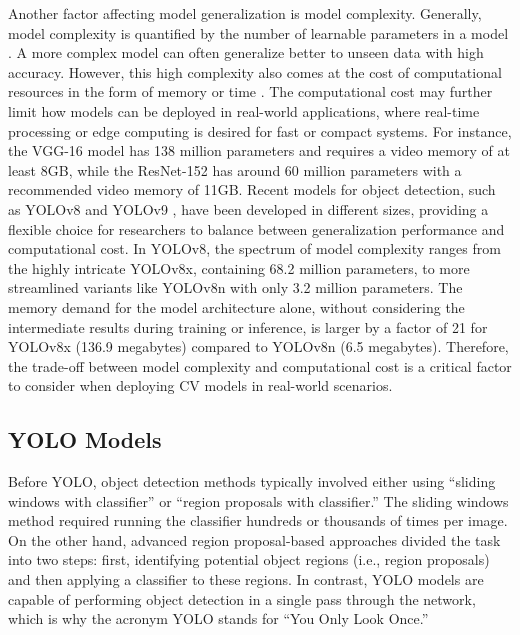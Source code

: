Another factor affecting model generalization is model complexity. Generally, model complexity is quantified by the number of learnable parameters in a model \cite{hu2021model}. A more complex model can often generalize better to unseen data with high accuracy. However, this high complexity also comes at the cost of computational resources in the form of memory or time \cite{justus2018predicting}. The computational cost may further limit how models can be deployed in real-world applications, where real-time processing or edge computing is desired for fast or compact systems. For instance, the VGG-16 model \cite{simonyan2014very} has 138 million parameters and requires a video memory of at least 8GB, while the ResNet-152 \cite{he2016deep} has around 60 million parameters with a recommended video memory of 11GB. Recent models for object detection, such as YOLOv8 \cite{ultralyticsYOLOv8} and YOLOv9 \cite{wang2024yolov9}, have been developed in different sizes, providing a flexible choice for researchers to balance between generalization performance and computational cost. In YOLOv8, the spectrum of model complexity ranges from the highly intricate YOLOv8x, containing 68.2 million parameters, to more streamlined variants like YOLOv8n with only 3.2 million parameters. The memory demand for the model architecture alone, without considering the intermediate results during training or inference, is larger by a factor of 21 for YOLOv8x (136.9 megabytes) compared to YOLOv8n (6.5 megabytes). Therefore, the trade-off between model complexity and computational cost is a critical factor to consider when deploying CV models in real-world scenarios.

\subsection*{YOLO Models}

Before YOLO, object detection methods typically involved either using “sliding windows with classifier” or “region proposals with classifier.” The sliding windows method required running the classifier hundreds or thousands of times per image. On the other hand, advanced region proposal-based approaches divided the task into two steps: first, identifying potential object regions (i.e., region proposals) and then applying a classifier to these regions. In contrast, YOLO models are capable of performing object detection in a single pass through the network, which is why the acronym YOLO stands for “You Only Look Once.”


